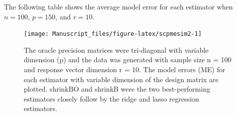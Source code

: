 \documentclass[11pt,]{report}
\theoremstyle{definition}
\theoremstyle{definition}
\theoremstyle{definition}
\theoremstyle{remark}
\begin{document}
The following table shows the average model error for each estimator when \(n = 100\), \(p = 150\), and \(r = 10\).

\vspace{0.5cm}
\begin{figure}

{\centering \texttt{[image: Manuscript\_files/figure-latex/scpmesim2-1]} 

}

\caption{The oracle precision matrices were tri-diagonal with variable dimension (p) and the data was generated with sample size n = 100 and response vector dimension r = 10. The model errors (ME) for each estimator with variable dimension of the design matrix are plotted. shrinkBO and shrinkB were the two best-performing estimators closely follow by the ridge and lasso regression estimators.}\label{fig:scpmesim2}
\end{figure}

\newpage
\end{document}
